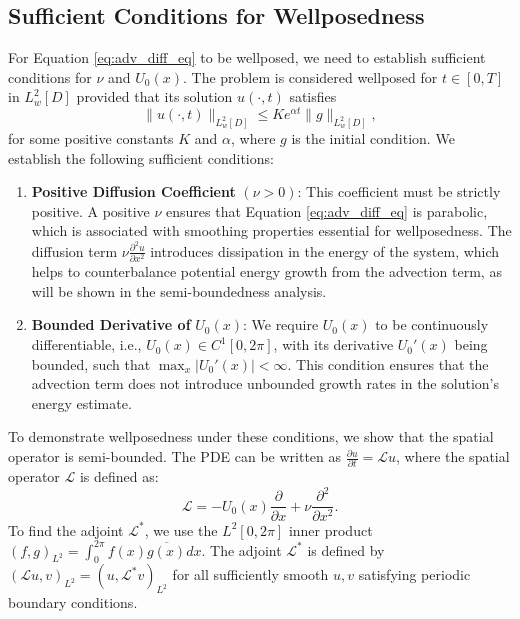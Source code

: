 \subsection{Sufficient Conditions for Wellposedness}\label{sub:wellposedness}
For Equation \ref{eq:adv_diff_eq} to be wellposed, we need to establish sufficient conditions for $\nu$ and $U_0(x)$.
The problem is considered wellposed for $t \in [0, T]$ in $L^2_w[D]$ provided that its solution $u(\cdot, t)$ satisfies
\begin{equation}
    \|u(\cdot, t)\|_{L_w^2[D]} \leq K e^{\alpha t}\|g\|_{L_w^2[D]},
    \label{eq:wellposed_def}
\end{equation}
for some positive constants $K$ and $\alpha$, where $g$ is the initial condition. \newline
\newline
We establish the following sufficient conditions:
\begin{enumerate}
    \item \textbf{Positive Diffusion Coefficient} $(\nu > 0)$: This coefficient must be strictly positive. A positive $\nu$ ensures that Equation \ref{eq:adv_diff_eq} is parabolic, which is associated with smoothing properties essential for wellposedness. The diffusion term $\nu \frac{\partial^2 u}{\partial x^2}$ introduces dissipation in the energy of the system, which helps to counterbalance potential energy growth from the advection term, as will be shown in the semi-boundedness analysis.
    \item \textbf{Bounded Derivative of} $U_0(x)$: We require $U_0(x)$ to be continuously differentiable, i.e., $U_0(x) \in C^1[0,2\pi]$, with its derivative $U_0'(x)$ being bounded, such that $\max_x|U_0'(x)| < \infty$. This condition ensures that the advection term does not introduce unbounded growth rates in the solution's energy estimate.
\end{enumerate}
%
To demonstrate wellposedness under these conditions, we show that the spatial operator is semi-bounded. The PDE can be written as $\frac{\partial u}{\partial t} = \mathcal{L}u$, where the spatial operator $\mathcal{L}$ is defined as:
\begin{equation}
    \mathcal{L} = - U_0(x) \frac{\partial}{\partial x} + \nu \frac{\partial^2}{\partial x^2}.
    \label{eq:oper_semi_bound}
\end{equation}
To find the adjoint $\mathcal{L}^*$, we use the $L^2[0, 2\pi]$ inner product $(f,g)_{L^2} = \int_0^{2\pi} f(x) \overline{g(x)} dx$. The adjoint $\mathcal{L}^*$ is defined by $(\mathcal{L}u, v)_{L^2} = (u, \mathcal{L}^*v)_{L^2}$ for all sufficiently smooth $u,v$ satisfying periodic boundary conditions.

